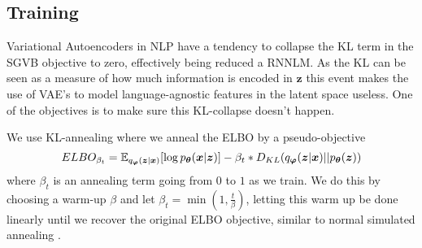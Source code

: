 \subsection{Training}
Variational Autoencoders in NLP have a tendency to collapse the KL term in the
SGVB objective to zero, effectively being reduced a RNNLM. As the KL can be seen
as a measure of how much information is encoded in $\bm{z}$ this event makes the
use of VAE's to model language-agnostic features in the latent space useless.
One of the objectives is to make sure this KL-collapse doesn't happen.

We use KL-annealing where we anneal the ELBO by a pseudo-objective
\begin{equation}
  \label{eq:KL_annealing_ELBO}
  ELBO_{\beta_t} = \operatorname{\mathbb{E}}_{q_{\bm{\varphi}}(\bm{z} | \bm{x})}[\log p_{\bm{\theta}}(\bm{x} | \bm{z})] - \beta_t * D_{KL}(q_{\bm{\varphi}}(\bm{z} | \bm{x}) || p_{\bm{\theta}}(\bm{z}))
\end{equation}
where $\beta_t$ is an annealing term going from $0$ to $1$ as we train. We do
this by choosing a warm-up $\beta$ and let $\beta_t = \min(1, \frac{t}{\beta})$,
letting this warm up be done linearly until we recover the original ELBO
objective, similar to normal simulated annealing \cite{Kirkpatrick1983, kingma_auto-encoding_2013}.

